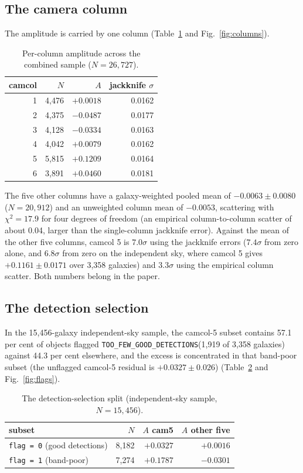 \documentclass[preprint,12pt,authoryear]{elsarticle}
\newcommand{\toofew}{\texttt{TOO\_\allowbreak FEW\_\allowbreak GOOD\_\allowbreak DETECTIONS}}
\begin{document}
\subsection{The camera column}
The amplitude is carried by one column (Table~\ref{tab:columns} and Fig.~\ref{fig:columns}).

\begin{table}[h]
\centering
\caption{Per-column amplitude across the combined sample ($N = 26,727$).}
\label{tab:columns}
\begin{tabular}{rrrr}
\toprule
camcol & $N$ & $A$ & jackknife $\sigma$ \\
\midrule
1 & 4,476 & $+0.0018$ & 0.0162 \\
2 & 4,375 & $-0.0487$ & 0.0177 \\
3 & 4,128 & $-0.0334$ & 0.0163 \\
4 & 4,042 & $+0.0079$ & 0.0162 \\
5 & 5,815 & $+0.1209$ & 0.0164 \\
6 & 3,891 & $+0.0460$ & 0.0181 \\
\bottomrule
\end{tabular}
\end{table}

The five other columns have a galaxy-weighted pooled mean of $-0.0063 \pm 0.0080$ ($N = 20,912$)
and an unweighted column mean of $-0.0053$, scattering with $\chi^2 = 17.9$ for four degrees of
freedom (an empirical column-to-column scatter of about 0.04, larger than the single-column
jackknife error). Against the mean of the other five columns, camcol 5 is $7.0\sigma$ using the
jackknife errors ($7.4\sigma$ from zero alone, and $6.8\sigma$ from zero on the independent sky,
where camcol 5 gives $+0.1161 \pm 0.0171$ over 3,358 galaxies) and $3.3\sigma$ using the empirical
column scatter. Both numbers
belong in the paper.

\subsection{The detection selection}
In the 15,456-galaxy independent-sky sample, the camcol-5 subset contains 57.1 per cent of objects
flagged \toofew (1,919 of 3,358 galaxies) against 44.3 per cent
elsewhere, and the excess is concentrated in that band-poor subset (the unflagged camcol-5
residual is $+0.0327 \pm 0.026$) (Table~\ref{tab:flags} and
Fig.~\ref{fig:flags}).

\begin{table}[h]
\centering
\caption{The detection-selection split (independent-sky sample, $N = 15,456$).}
\label{tab:flags}
\begin{tabular}{lrrr}
\toprule
subset & $N$ & $A$ cam5 & $A$ other five \\
\midrule
\texttt{flag = 0} (good detections) & 8,182 & $+0.0327$ & $+0.0016$ \\
\texttt{flag = 1} (band-poor) & 7,274 & $+0.1787$ & $-0.0301$ \\
\bottomrule
\end{tabular}
\end{table}
\end{document}
